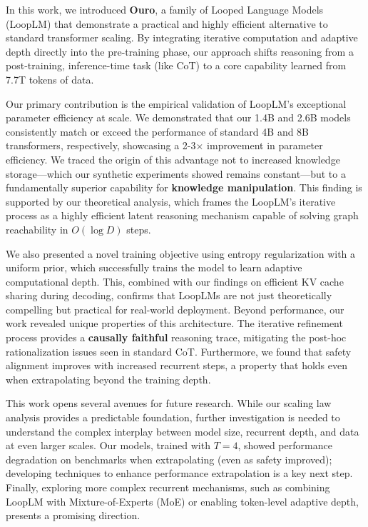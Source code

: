 \documentclass[]{bytedance_seed}
\newcommand{\1}{\mathbf{1}}
\newcommand{\ut}{LoopLM}
\begin{document}
In this work, we introduced \textbf{Ouro}, a family of Looped Language Models (\ut{}) that demonstrate a practical and highly efficient alternative to standard transformer scaling. By integrating iterative computation and adaptive depth directly into the pre-training phase, our approach shifts reasoning from a post-training, inference-time task (like CoT) to a core capability learned from 7.7T tokens of data.

Our primary contribution is the empirical validation of \ut{}'s exceptional parameter efficiency at scale. We demonstrated that our 1.4B and 2.6B models consistently match or exceed the performance of standard 4B and 8B transformers, respectively, showcasing a 2-3$\times$ improvement in parameter efficiency. We traced the origin of this advantage not to increased knowledge storage—which our synthetic experiments showed remains constant—but to a fundamentally superior capability for \textbf{knowledge manipulation}. This finding is supported by our theoretical analysis, which frames the \ut{}'s iterative process as a highly efficient latent reasoning mechanism capable of solving graph reachability in $O(\log D)$ steps.

We also presented a novel training objective using entropy regularization with a uniform prior, which successfully trains the model to learn adaptive computational depth. This, combined with our findings on efficient KV cache sharing during decoding, confirms that \ut{}s are not just theoretically compelling but practical for real-world deployment. Beyond performance, our work revealed unique properties of this architecture. The iterative refinement process provides a \textbf{causally faithful} reasoning trace, mitigating the post-hoc rationalization issues seen in standard CoT. Furthermore, we found that safety alignment improves with increased recurrent steps, a property that holds even when extrapolating beyond the training depth.

This work opens several avenues for future research. While our scaling law analysis provides a predictable foundation, further investigation is needed to understand the complex interplay between model size, recurrent depth, and data at even larger scales. Our models, trained with $T=4$, showed performance degradation on benchmarks when extrapolating (even as safety improved); developing techniques to enhance performance extrapolation is a key next step. Finally, exploring more complex recurrent mechanisms, such as combining \ut{} with Mixture-of-Experts (MoE) or enabling token-level adaptive depth, presents a promising direction.
\end{document}
